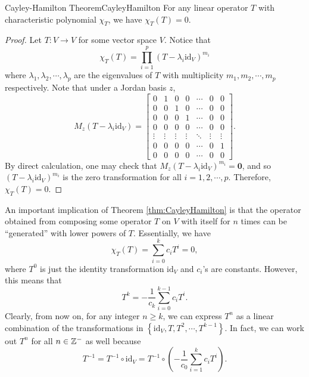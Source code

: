 \documentclass[math]{amznotes}
\theoremstyle{remark}
\newcommand{\zero}{\mathbf{0}}
\begin{document}
\begin{thmbox}{Cayley-Hamilton Theorem}{CayleyHamilton}
    For any linear operator $T$ with characteristic polynomial $\chi_T$, we have $\chi_T(T) = 0$.
    \tcblower
    \begin{proof}
        Let $T \colon V \to V$ for some vector space $V$. Notice that 
        \begin{equation*}
            \chi_T(T) = \prod_{i = 1}^{p}(T - \lambda_i\mathrm{id}_V)^{m_i}
        \end{equation*}
        where $\lambda_1, \lambda_2, \cdots, \lambda_p$ are the eigenvalues of $T$ with multiplicity $m_1, m_2, \cdots, m_p$ respectively. Note that under a Jordan basis $z$, 
        \begin{equation*}
            M_z(T - \lambda_i\mathrm{id}_V) = \begin{bmatrix}
                0 & 1 & 0 & 0 & \cdots & 0 & 0 \\
                0 & 0 & 1 & 0 & \cdots & 0 & 0 \\
                0 & 0 & 0 & 1 & \cdots & 0 & 0 \\
                0 & 0 & 0 & 0 & \cdots & 0 & 0 \\
                \vdots & \vdots & \vdots & \vdots & \ddots & \vdots & \vdots \\
                0 & 0 & 0 & 0 & \cdots & 0 & 1 \\
                0 & 0 & 0 & 0 & \cdots & 0 & 0
            \end{bmatrix}.
        \end{equation*}
        By direct calculation, one may check that $M_z(T - \lambda_i\mathrm{id}_V)^{m_i} = \zero$, and so $(T - \lambda_i\mathrm{id}_V)^{m_i}$ is the zero transformation for all $i = 1, 2, \cdots, p$. Therefore, $\chi_T(T) = 0$.
    \end{proof}
\end{thmbox}
An important implication of Theorem \ref{thm:CayleyHamilton} is that the operator obtained from composing some operator $T$ on $V$ with itself for $n$ times can be ``generated'' with lower powers of $T$. Essentially, we have 
\begin{equation*}
    \chi_T(T) = \sum_{i = 0}^{k}c_iT^i = 0,
\end{equation*}
where $T^0$ is just the identity transformation $\mathrm{id}_V$ and $c_i$'s are constants. However, this means that 
\begin{equation*}
    T^k = -\frac{1}{c_k}\sum_{i = 0}^{k - 1}c_iT^i.
\end{equation*}
Clearly, from now on, for any integer $n \geq k$, we can express $T^n$ as a linear combination of the transformations in $\left\{\mathrm{id}_V, T, T^2, \cdots, T^{k - 1}\right\}$. In fact, we can work out $T^n$ for all $n \in \mathbb{Z}^-$ as well because 
\begin{equation*}
    T^{-1} = T^{-1} \circ \mathrm{id}_V = T^{-1} \circ \left(-\frac{1}{c_0}\sum_{i = 1}^{k}c_iT^i\right).
\end{equation*}
\end{document}
